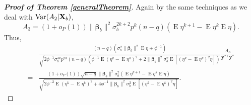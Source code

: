 \documentclass[11pt]{article}
\DeclareMathOperator{\myE}{E}
\DeclareMathOperator{\myVar}{Var}
\newcommand{\By}{\mathbf{y}}    \newcommand{\Bz}{\mathbf{z}}
\newcommand{\bfsym}[1]{\ensuremath{\boldsymbol{#1}}}
\def\bbeta{\bfsym \beta}
\theoremstyle{plain}
\theoremstyle{definition}
\theoremstyle{remark}
\begin{document}
\begin{appendices}
\begin{proof}[\textbf{Proof of Theorem \ref{generalTheorem}}]
Again by the same techniques as we deal with $\myVar (A_2 | \BX_b)$, 
\begin{equation*}
    A_3=
    (1+o_P(1)) \|\bbeta_b\|^2 \sigma_b^{2k+2} p^{k} (n-q) \left(\myE \eta^{k+1} - \myE \eta^k \myE \eta\right)
    .
\end{equation*}
Thus,
\begin{equation}\label{eq:raA3}
    \begin{split}
    &\frac{
        (n-q)\left(
        \sigma_b^2 \|\bbeta_b\|^2  \myE \eta
+\phi^{-1}
\right)
    }{\sqrt{
            2\phi^{-1}
            \sigma_b^{4k} p^{2k}
            (n-q)
            \left( 
                \phi^{-1} \myE (\eta^k - \myE \eta^k)^2
                +
                2\|\bbeta_b\|^2 \sigma_b^2 \myE [(\eta^k - \myE \eta^k)^2\eta]
            \right)
    }}
    \frac{
        A_3
    }{\By^{*\top} \By^*}
    \\
    =&
    \frac{
        (1+o_P(1)) \sqrt{n-q} \|\bbeta_b\|^2 \sigma_b^{2}  \left(\myE \eta^{k+1} - \myE \eta^k \myE \eta\right)
    }{\sqrt{
                2\phi^{-2} \myE (\eta^k - \myE \eta^k)^2
                +
            4\phi^{-1}
                \|\bbeta_b\|^2 \sigma_b^2 \myE [(\eta^k - \myE \eta^k)^2\eta]
        }}.
    \end{split}
\end{equation}


\end{proof}
\end{appendices}
\end{document}
